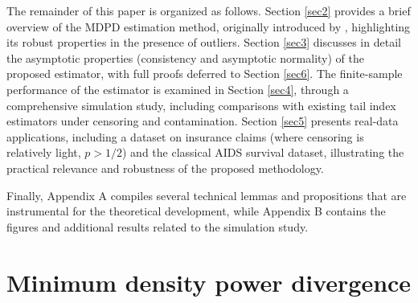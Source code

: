 \documentclass[reqno,openbib,runningheads,a4paper,12pt]{amsart}%
\begin{document}
\noindent The remainder of this paper is organized as follows. Section
\ref{sec2} provides a brief overview of the MDPD estimation method, originally
introduced by \cite{Basu98}, highlighting its robust properties in the
presence of outliers. Section \ref{sec3} discusses in detail the asymptotic
properties (consistency and asymptotic normality) of the proposed estimator,
with full proofs deferred to Section \ref{sec6}. The finite-sample performance
of the estimator is examined in Section \ref{sec4}, through a comprehensive
simulation study, including comparisons with existing tail index estimators
under censoring and contamination. Section \ref{sec5} presents real-data
applications, including a dataset on insurance claims (where censoring is
relatively light, $p>1/2$) and the classical AIDS survival dataset,
illustrating the practical relevance and robustness of the proposed
methodology.\smallskip

\noindent Finally, Appendix A compiles several technical lemmas and
propositions that are instrumental for the theoretical development, while
Appendix B contains the figures and additional results related to the
simulation study.

\section{\textbf{Minimum density power divergence\label{sec2}}}
\end{document}
